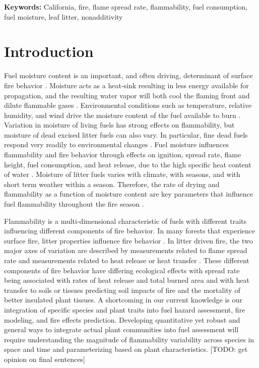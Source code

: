 \documentclass[letterpaper,12pt]{article}
\begin{document}
\noindent \textbf{Keywords:} California, fire, flame spread rate, flammability, fuel consumption, fuel moisture, leaf litter, nonadditivity

\newpage

\section*{Introduction}

Fuel moisture content is an important, and often driving, determinant of
surface fire behavior \citep{Rothermel-1972}. Moisture acts as a heat-sink
resulting in less energy available for propagation, and the resulting water
vapor will both cool the flaming front and dilute flammable gases
\citep{Albini-1976, Shafizadeh-1977}. Environmental conditions such as
temperature, relative humidity, and wind drive the moisture content of the fuel
available to burn \citep{Kreye+Varner+etal-2018}. Variation in moisture of
living fuels has strong effects on flammability, but moisture of dead excised
litter fuels can also vary. In particular, fine dead fuels respond very readily
to environmental changes \citep{Nelson-2001}. Fuel moisture influences
flammability and fire behavior through effects on ignition, spread rate, flame
height, fuel consumption, and heat release, due to the high specific heat
content of water \citep{Rothermel-1972, Nelson-2001}. Moisture of litter fuels
varies with climate, with seasons, and with short term weather within a season.
Therefore, the rate of drying and flammability as a function of moisture
content are key parameters that influence fuel flammability throughout the fire
season \citep{Nelson-2001}.

Flammability is a multi-dimensional characteristic of fuels
\citep{Schwilk-2015, Pausas+Keeley+etal-2017} with different traits influencing
different components of fire behavior. In many forests that experience surface
fire, litter properties influence fire behavior
\citep{Ganteaume+Marielle+etal-2011, Schwilk+Caprio-2011,
  Varner+Kane+etal-2015}. In litter driven fire, the two major axes of
variation are described by measurements related to flame spread rate and
measurements related to heat release or heat transfer
\citep{Magalhaes+Schwilk-2012, Prior+Murphy+etal-2018}. These different
components of fire behavior have differing ecological effects with spread rate
being associated with rates of heat release and total burned area and with heat
transfer to soils or tissues predicting soil impacts of fire and the mortality
of better insulated plant tissues. A shortcoming in our current knowledge is
our integration of specific species and plant traits into fuel hazard
assessment, fire modeling, and fire effects prediction. Developing quantitative
yet robust and general ways to integrate actual plant communities into fuel
assessment will require understanding the magnitude of flammability variability
across species in space and time and parameterizing based on plant
characteristics. [TODO: get opinion on final sentences]
\end{document}

